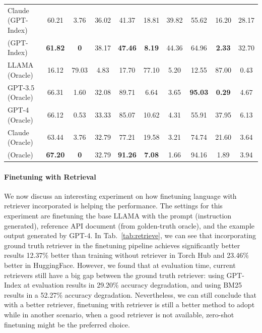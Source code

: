 \begin{table}[h]
\begin{adjustbox}{width=\textwidth}
\begin{tabular}{l c c c | c c c | c c c}
    Claude (GPT-Index) & 60.21 & 3.76 & 36.02 & 41.37 & 18.81 & 39.82 & 55.62 & 16.20 & 28.17 \\
    \gorilla{} (GPT-Index) & \textbf{61.82} & \textbf{0} & 38.17 & \textbf{47.46} & \textbf{8.19} & 44.36 & 64.96 & \textbf{2.33} & 32.70 \\
    \midrule
    LLAMA (Oracle) & 16.12 & 79.03 & 4.83 & 17.70 & 77.10 & 5.20 & 12.55 & 87.00 & 0.43 \\
    GPT-3.5 (Oracle) & 66.31 & 1.60 & 32.08 & 89.71 & 6.64 & 3.65 & \textbf{95.03} & \textbf{0.29} & 4.67 \\
    GPT-4 (Oracle) & 66.12 & 0.53 & 33.33 & 85.07 & 10.62 & 4.31 & 55.91 & 37.95 & 6.13 \\
    Claude (Oracle) & 63.44 & 3.76 & 32.79 & 77.21 & 19.58 & 3.21 & 74.74 & 21.60 & 3.64 \\
    \gorilla{} (Oracle) & \textbf{67.20} & \textbf{0} & 32.79 & \textbf{91.26} & \textbf{7.08} & 1.66 & 94.16 & 1.89 & 3.94 \\
    \bottomrule
    \end{tabular}
    \end{adjustbox}
\end{table}



\paragraph{Finetuning with Retrieval} We now discuss an interesting experiment on how finetuning language with retriever incorporated is helping the performance. The settings for this experiment are finetuning the base LLAMA with the prompt (instruction generated), reference API document (from golden-truth oracle), and the example output generated by GPT-4. In Tab.~\ref{tab:retrieve}, we can see that incorporating ground truth retriever in the finetuning pipeline achieves significantly better results 12.37\% better than training without retriever in Torch Hub and 23.46\% better in HuggingFace. However, we found that at evaluation time, current retrievers still have a big gap between the ground truth retriever: using GPT-Index at evaluation results in 29.20\% accuracy degradation, and using BM25 results in a 52.27\% accuracy degradation. Nevertheless, we can still conclude that with a better retriever, finetuning with retriever is still a better method to adopt while in another scenario, when a good retriever is not available, zero-shot finetuning might be the preferred choice.

